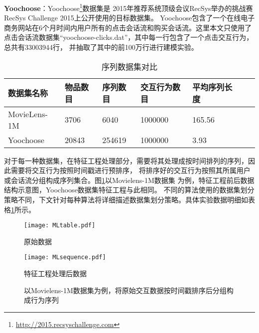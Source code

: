 \textbf{Yoochoose}：Yoochoose\footnote{\url{http://2015.recsyschallenge.com}}数据集是%
2015年推荐系统顶级会议RecSys举办的挑战赛RecSys Challenge 2015上公开使用的目标数据集。%
Yoochoose包含了一个在线电子商务网站在6个月时间内用户所有的点击会话流和购买会话流。这里本文只使用了%
点击会话流数据集“yoochoose-clicks.dat”，其中每一行包含了一个点击交互行为，总共有33003944行，%
并抽取了其中的前100万行进行建模实验。%
\begin{table}[]
  \centering
  \caption{序列数据集对比}
  \label{tab:datatable}
    \begin{tabular}{@{}lllllll@{}}
    \toprule
    数据集名称    & 物品数目 & 序列数目 & 交互行为数目 & 平均序列长度  \\ \midrule
    MovieLens-1M & 3706     & 6040 & 1000000 & 165.56 \\
    Yoochoose    & 20843 & 254619 & 1000000 & 3.93 \\ \bottomrule
    \end{tabular}
\end{table}
对于每一种数据集，在特征工程处理部分，需要将其处理成按时间排列的序列，因此需要将交互行为按照时间戳进行预排序，%
将排序好的交互行为按照其所属用户或会话流分组构成序列集合。图\ref{fig:feature_engine}以Movielens-1M数据集%
为例，特征工程前后数据结构示意图，Yoochoose数据集特征工程与此相同。
不同的算法使用的数据集划分策略不同，下文针对每种算法将详细描述数据集划分策略。具体实验数据明细如表格\ref{tab:datatable}所示。
\begin{figure}[!htb]
   \begin{minipage}{0.48\textwidth}
     \centering
     \texttt{[image: MLtable.pdf]} %
     \caption{原始数据}
   \end{minipage}\hfill
   \begin {minipage}{0.48\textwidth}
     \centering
     \texttt{[image: MLsequence.pdf]} %
     \caption{特征工程处理后数据}
   \end{minipage}
   \caption{以Movielens-1M数据集为例，将原始交互数据按时间戳排序后分组构成行为序列}
   \label{fig:feature_engine}
\end{figure}


